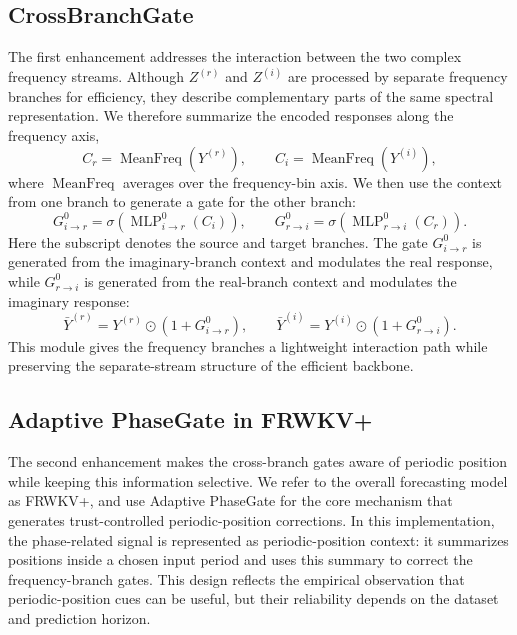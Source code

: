 \documentclass[a4paper,fleqn]{cas-sc}
\begin{document}
\subsection{CrossBranchGate}
The first enhancement addresses the interaction between the two complex frequency streams. Although $Z^{(r)}$ and $Z^{(i)}$ are processed by separate frequency branches for efficiency, they describe complementary parts of the same spectral representation. We therefore summarize the encoded responses along the frequency axis,
\begin{equation}
C_r = \operatorname{MeanFreq}(Y^{(r)}), \qquad C_i = \operatorname{MeanFreq}(Y^{(i)}),
\end{equation}
where $\operatorname{MeanFreq}$ averages over the frequency-bin axis. We then use the context from one branch to generate a gate for the other branch:
\begin{equation}
G_{i\to r}^0 = \sigma(\operatorname{MLP}_{i\to r}^{0}(C_i)), \qquad
G_{r\to i}^0 = \sigma(\operatorname{MLP}_{r\to i}^{0}(C_r)).
\end{equation}
Here the subscript denotes the source and target branches. The gate $G_{i\to r}^0$ is generated from the imaginary-branch context and modulates the real response, while $G_{r\to i}^0$ is generated from the real-branch context and modulates the imaginary response:
\begin{equation}
\bar{Y}^{(r)} = Y^{(r)} \odot (1 + G_{i\to r}^0), \qquad
\bar{Y}^{(i)} = Y^{(i)} \odot (1 + G_{r\to i}^0).
\end{equation}
This module gives the frequency branches a lightweight interaction path while preserving the separate-stream structure of the efficient backbone.

\subsection{Adaptive PhaseGate in FRWKV+}
The second enhancement makes the cross-branch gates aware of periodic position while keeping this information selective. We refer to the overall forecasting model as FRWKV+, and use Adaptive PhaseGate for the core mechanism that generates trust-controlled periodic-position corrections. In this implementation, the phase-related signal is represented as periodic-position context: it summarizes positions inside a chosen input period and uses this summary to correct the frequency-branch gates. This design reflects the empirical observation that periodic-position cues can be useful, but their reliability depends on the dataset and prediction horizon.
\end{document}

